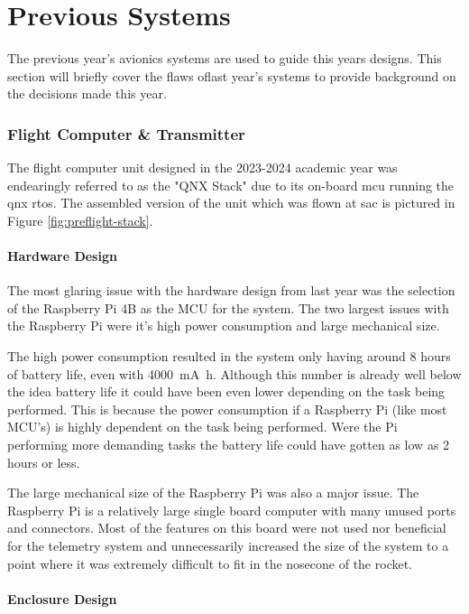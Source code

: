 \part{Previous Systems}

The previous year's avionics systems are used to guide this years designs. This section will briefly cover the flaws
oflast year's systems to provide background on the decisions made this year.

\section{Flight Computer \& Transmitter}

The flight computer unit designed in the 2023-2024 academic year was endearingly referred to as the "QNX Stack" due to
its on-board \gls{mcu} running the \gls{qnx} \gls{rtos}. The assembled version of the unit which was flown at \gls{sac}
is pictured in Figure \ref{fig:preflight-stack}.

\subsection{Hardware Design}

The most glaring issue with the hardware design from last year was the selection of the Raspberry Pi 4B as the MCU for
the system. The two largest issues with the Raspberry Pi were it's high power consumption and large mechanical size.

The high power consumption resulted in the system only having around 8 hours of battery life, even with
\qty{4000}{\milli\ampere\hour}. Although this number is already well below the idea battery life it could have been
even lower depending on the task being performed. This is because the power consumption if a Raspberry Pi (like most
MCU's) is highly dependent on the task being performed. Were the Pi performing more demanding tasks the battery life
could have gotten as low as 2 hours or less.

The large mechanical size of the Raspberry Pi was also a major issue. The Raspberry Pi is a relatively large single
board computer with many unused ports and connectors. Most of the features on this board were not used nor beneficial
for the telemetry system and unnecessarily increased the size of the system to a point where it was extremely difficult
to fit in the nosecone of the rocket.

\subsection{Enclosure Design}

